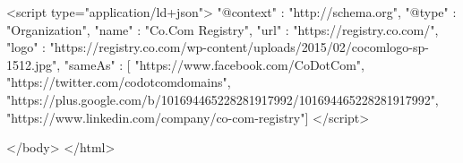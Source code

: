   <script type="application/ld+json">
  { "@context" : "http://schema.org",
    "@type" : "Organization",
    "name" : "Co.Com Registry",
    "url" : "https://registry.co.com/",
    "logo" : "https://registry.co.com/wp-content/uploads/2015/02/cocomlogo-sp-1512.jpg",
    "sameAs" : [ "https://www.facebook.com/CoDotCom",
      "https://twitter.com/codotcomdomains",
      "https://plus.google.com/b/101694465228281917992/101694465228281917992",
      "https://www.linkedin.com/company/co-com-registry"] 
  }
  </script>

</body>
</html>
